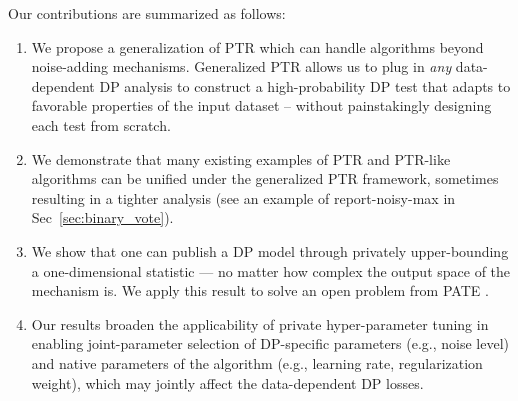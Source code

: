 Our contributions are summarized as follows:
\begin{enumerate}
    \item We propose a generalization of PTR which can handle algorithms beyond noise-adding mechanisms. Generalized PTR allows us to plug in \emph{any} data-dependent DP analysis to construct a high-probability DP test that adapts to favorable properties of the input dataset -- without painstakingly designing each test from scratch.
    \item We demonstrate that many existing examples of PTR and PTR-like algorithms can be unified under the generalized PTR framework, sometimes resulting in a tighter analysis (see an example of report-noisy-max in Sec~\ref{sec:binary_vote}).   %
    \item We show that one can publish a DP model through privately upper-bounding a one-dimensional statistic --- no matter how complex the output space of the mechanism is. We apply this result to solve an open problem from PATE \citep{papernot2017, papernot2018scalable}.    %
    \item Our results broaden the applicability of private hyper-parameter tuning \citep{liu2019private,papernot2021hyperparameter} in enabling joint-parameter selection of  DP-specific parameters (e.g., noise level) and native parameters of the algorithm (e.g., learning rate, regularization weight), which may jointly affect the data-dependent DP losses.    %
\end{enumerate}


